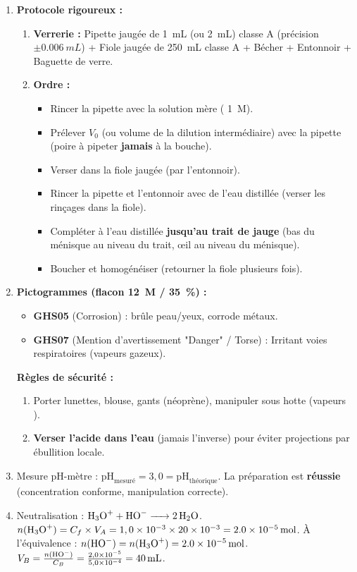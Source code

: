 \documentclass[11pt]{article}
\begin{document}
\begin{exoresolu}
\begin{enumerate}
\item \textbf{Protocole rigoureux :}
\begin{enumerate}
\item \textbf{Verrerie :} Pipette jaugée de \SI{1}{mL} (ou \SI{2}{mL}) classe A (précision $\pm \SI{0,006}{mL}$) + Fiole jaugée de \SI{250}{mL} classe A + Bécher + Entonnoir + Baguette de verre.
\item \textbf{Ordre :}
    \begin{itemize}
    \item Rincer la pipette avec la solution mère ( \SI{1}{M}).
    \item Prélever $V_0$ (ou volume de la dilution intermédiaire) avec la pipette (poire à pipeter \textbf{jamais} à la bouche).
    \item Verser dans la fiole jaugée (par l'entonnoir).
    \item Rincer la pipette et l'entonnoir avec de l'eau distillée (verser les rinçages dans la fiole).
    \item Compléter à l'eau distillée \textbf{jusqu'au trait de jauge} (bas du ménisque au niveau du trait, œil au niveau du ménisque).
    \item Boucher et homogénéiser (retourner la fiole plusieurs fois).
    \end{itemize}
\end{enumerate}
\item \textbf{Pictogrammes (flacon  \SI{12}{M} / \SI{35}{\%}) :}
\begin{itemize}
\item \textbf{GHS05} (Corrosion) : brûle peau/yeux, corrode métaux.
\item \textbf{GHS07} (Mention d'avertissement "Danger" / Torse) : Irritant voies respiratoires (vapeurs  gazeux).
\end{itemize}
\textbf{Règles de sécurité :}
\begin{enumerate}
\item Porter lunettes, blouse, gants (néoprène), manipuler sous hotte (vapeurs ).
\item \textbf{Verser l'acide dans l'eau} (jamais l'inverse) pour éviter projections par ébullition locale.
\end{enumerate}
\item Mesure pH-mètre : $\mathrm{pH}_{\text{mesuré}} = 3,0 = \mathrm{pH}_{\text{théorique}}$.
La préparation est \textbf{réussie} (concentration conforme, manipulation correcte).
\item Neutralisation : $\ce{H3O+ + HO- -> 2 H2O}$.
$n(\ce{H3O+}) = C_f \times V_A = 1,0 \times 10^{-3} \times 20 \times 10^{-3} = \SI{2,0e-5}{mol}$.
À l'équivalence : $n(\ce{HO-}) = n(\ce{H3O+}) = \SI{2,0e-5}{mol}$.
$V_B = \frac{n(\ce{HO-})}{C_B} = \frac{2,0 \times 10^{-5}}{5,0 \times 10^{-4}} = \mathbf{\SI{40}{mL}}$.
\end{enumerate}
\end{exoresolu}
\end{document}
